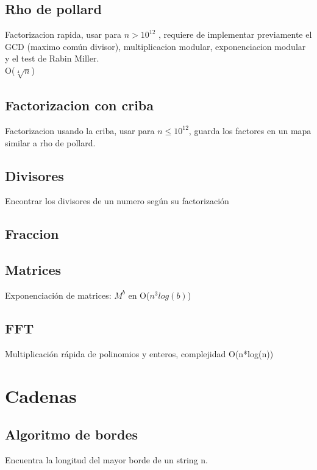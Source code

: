 \documentclass[10pt,landscape,twocolumn,letterpaper,twosided]{article}
\newcommand\cppfile[2][]{

}
\begin{document}
			\subsection{Rho de pollard}
			Factorizacion rapida, usar para $n > 10^{12}$ , requiere de implementar previamente el GCD
			(maximo común divisor), multiplicacion modular,	exponenciacion modular y el test de Rabin Miller.\\
			O($\sqrt[4]{n}$)
			\cppfile[52-77]{matematicas/rho_de_pollard.cpp}
			\subsection{Factorizacion con criba}
			Factorizacion usando la criba, usar para $n \leq 10^{12}$, guarda los factores en un mapa 
			similar a rho de pollard.
			\cppfile[10-48]{matematicas/factorizacion_criba.cpp}
			\subsection{Divisores}
			Encontrar los divisores de un numero según su factorización
			\cppfile[82-100]{matematicas/divisores.cpp}
			\subsection{Fraccion}
			\cppfile[9-45]{matematicas/fraccion.cpp}
			\subsection{Matrices}
			Exponenciación de matrices: $M^b$ en O($n^{3} log (b)$)
			\cppfile[8-36]{matematicas/matrices.cpp}
			\subsection{FFT}
			Multiplicación rápida de polinomios y enteros, complejidad O(n*log(n))
			\cppfile[10-67]{matematicas/FFT.cpp}
		\section{Cadenas}
			\subsection{Algoritmo de bordes}
			Encuentra la longitud del mayor borde de un string n.
			\cppfile[4-16]{cadenas/bordes.cpp}
\end{document}
